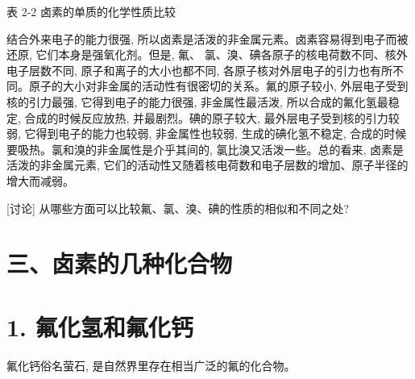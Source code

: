 \documentclass[10pt]{article}
\begin{document}
表 2-2 卤素的单质的化学性质比较

\begin{center}
\end{center}

结合外来电子的能力很强, 所以卤素是活泼的非金属元素。卤素容易得到电子而被还原, 它们本身是强氧化剂。但是, 氟、 氯、溴、碘各原子的核电荷数不同、核外电子层数不同, 原子和离子的大小也都不同, 各原子核对外层电子的引力也有所不同。原子的大小对非金属的活动性有很密切的关系。氟的原子较小, 外层电子受到核的引力最强, 它得到电子的能力很强, 非金属性最活泼, 所以合成的氟化氢最稳定, 合成的时候反应放热, 并最剧烈。碘的原子较大, 最外层电子受到核的引力较弱, 它得到电子的能力也较弱, 非金属性也较弱, 生成的碘化氢不稳定, 合成的时候要吸热。氯和溴的非金属性是介乎其间的, 氯比溴又活泼一些。总的看来, 卤素是活泼的非金属元素, 它们的活动性又随着核电荷数和电子层数的增加、原子半径的增大而减弱。

[讨论] 从哪些方面可以比较氟、氯、溴、碘的性质的相似和不同之处?

\section*{三、卤素的几种化合物}

\section*{1. 氟化氢和氟化钙}

氟化钙俗名萤石, 是自然界里存在相当广泛的氟的化合物。
\end{document}
